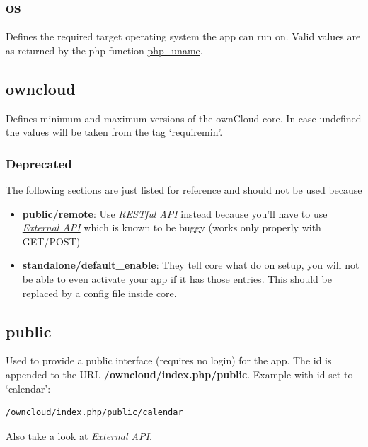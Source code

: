 \documentclass[letterpaper,10pt,english]{sphinxmanual}
\begin{document}
\subsection{os}
\label{app/info:os}
Defines the required target operating system the app can run on. Valid values are as returned by the php function \href{http://php.net/manual/en/function.php-uname.php}{php\_uname}.


\subsection{owncloud}
\label{app/info:owncloud}
Defines minimum and maximum versions of the ownCloud core. In case undefined the values will be taken from the tag `requiremin'.


\subsubsection{Deprecated}
\label{app/info:deprecated}
The following sections are just listed for reference and should not be used because
\begin{itemize}
\item {} 
\textbf{public/remote}: Use {\hyperref[app/api::doc]{\emph{RESTful API}}} instead because you'll have to use {\hyperref[core/externalapi::doc]{\emph{External API}}} which is known to be buggy (works only properly with GET/POST)

\item {} 
\textbf{standalone/default\_enable}: They tell core what do on setup, you will not be able to even activate your app if it has those entries. This should be replaced by a config file inside core.

\end{itemize}


\subsection{public}
\label{app/info:public}
Used to provide a public interface (requires no login) for the app. The id is appended to the URL \textbf{/owncloud/index.php/public}. Example with id set to `calendar':

\begin{Verbatim}[commandchars=\\\{\}]
/owncloud/index.php/public/calendar
\end{Verbatim}

Also take a look at {\hyperref[core/externalapi::doc]{\emph{External API}}}.
\end{document}
